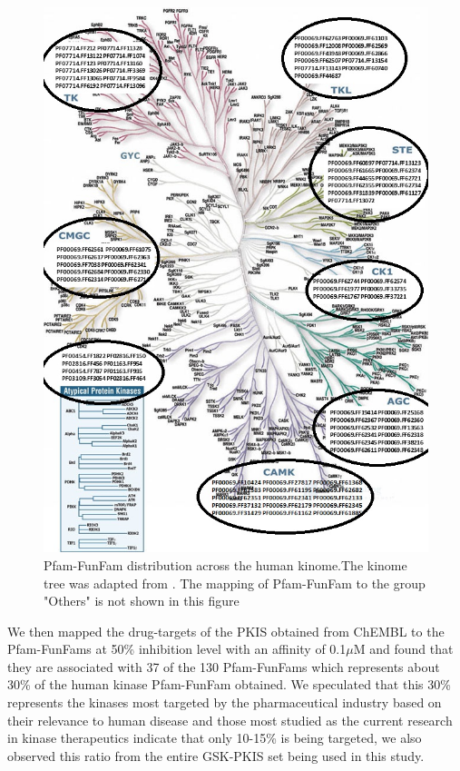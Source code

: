 \documentclass[a4paper, 11pt]{article}
\begin{document}
\begin{figure}[H]
	\includegraphics[width=.9\linewidth]{figures/kinometree.jpg}
	\centering
	\caption{Pfam-FunFam distribution across the human kinome.The kinome tree was adapted from \cite{manning2002protein}. The mapping of Pfam-FunFam to the group "Others" is not shown in this figure}
	\label{kinasetree}
\end{figure}
We then mapped the drug-targets of the PKIS obtained from ChEMBL to the Pfam-FunFams at 50\% inhibition level with an affinity of 0.1$\mu$M and found that they are associated with 37 of the 130 Pfam-FunFams which represents about 30\% of the human kinase Pfam-FunFam obtained. We speculated that this 30\% represents the kinases most targeted by the pharmaceutical industry based on their relevance to human disease and those most studied as the current research in kinase therapeutics indicate that only 10-15\% is being targeted, we also observed this ratio from the entire GSK-PKIS set being used in this study.
\end{document}
